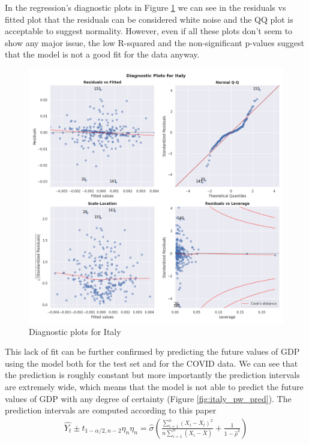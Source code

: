 In the regression's diagnostic plots in Figure \ref{fig:italy_diag} we can see in the residuals vs fitted plot that the residuals can be considered white noise and the QQ plot is acceptable to suggest normality. However, even if all these plots don't seem to show any major issue, the low R-squared and the non-significant p-values suggest that the model is not a good fit for the data anyway.
\begin{figure}[H]
  \includegraphics[width=.9\linewidth]{imgs/italy_diagnostic_plots.png}
  \caption{Diagnostic plots for Italy}
  \label{fig:italy_diag}
\end{figure}

This lack of fit can be further confirmed by predicting the future values of GDP using the model both for the test set and for the COVID data. We can see that the prediction is roughly constant but more importantly the prediction intervals are extremely wide, which means that the model is not able to predict the future values of GDP with any degree of certainty (Figure \ref{fig:italy_pw_pred}).
The prediction intervals are computed according to this paper \cite{prais_ci}
\begin{align*}
  \hat{Y_t} \pm t_{1-\alpha/2, n-2} \eta_n
  \eta_n = \hat{\sigma} \left( \frac{\sum_{i=1}^n(X_i - X_t)^2}{n \sum_{i=1}^n (X_i - \bar{X})} + \frac{1}{1-\hat{\rho}^2} \right)
\end{align*}

